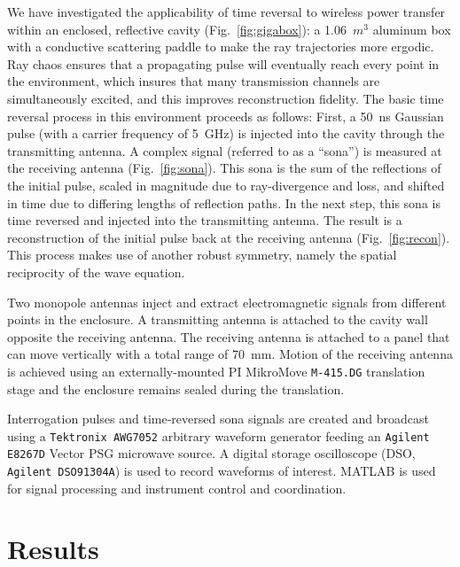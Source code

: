 \documentclass[conference]{IEEEtran}
\begin{document}
We have investigated the applicability of time reversal to wireless power
transfer within an enclosed, reflective cavity (Fig.~\ref{fig:gigabox}): a
1.06~$m^3$ aluminum box with a conductive scattering paddle to make the ray
trajectories more ergodic.
%
Ray chaos ensures that a propagating pulse will eventually reach every point in
the environment, which insures that many transmission channels are
simultaneously excited, and this improves reconstruction fidelity.
%
The basic time reversal process in this environment proceeds as follows: First,
a 50~ns Gaussian pulse (with a carrier frequency of 5~GHz) is injected into
the cavity through the transmitting antenna.
%
A complex signal (referred to as a ``sona'') is measured at the receiving
antenna (Fig.~\ref{fig:sona}).
%
This sona is the sum of the reflections of the initial pulse, scaled in
magnitude due to ray-divergence and loss, and shifted in time due to differing
lengths of reflection paths.
%
In the next step, this sona is time reversed and injected into the transmitting
antenna.
%
The result is a reconstruction of the initial pulse back at the receiving
antenna (Fig.~\ref{fig:recon}).
%
This process makes use of another robust symmetry, namely the spatial
reciprocity of the wave equation.



Two monopole antennas inject and extract electromagnetic signals from different
points in the enclosure. A transmitting antenna is attached to the cavity wall
opposite the receiving antenna.
%
The receiving antenna is attached to a panel that can move vertically with a
total range of 70~mm.
%
Motion of the receiving antenna is achieved using an externally-mounted PI
MikroMove \texttt{M-415.DG} translation stage and the enclosure remains sealed
during the translation.



Interrogation pulses and time-reversed sona signals are created and broadcast
using a \texttt{Tektronix AWG7052} arbitrary waveform generator feeding an
\texttt{Agilent E8267D} Vector PSG microwave source.
%
A digital storage oscilloscope (DSO, \texttt{Agilent DSO91304A}) is used to
record waveforms of interest. MATLAB is used for signal processing and
instrument control and coordination.


\section{Results}
\end{document}
